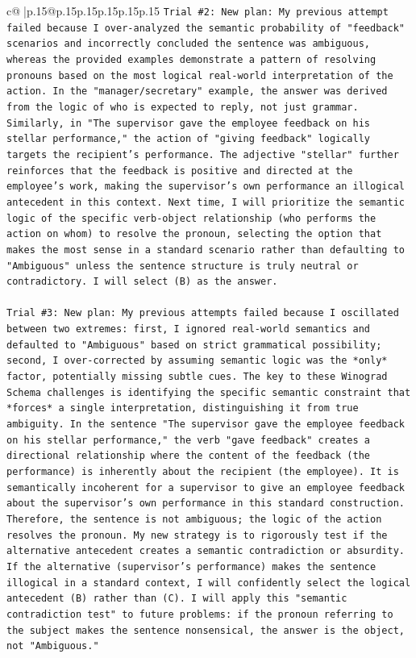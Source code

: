 \documentclass{article}
\begin{document}
{\begin{supertabular}{c@{$\;$}|p{.15\linewidth}@{}p{.15\linewidth}p{.15\linewidth}p{.15\linewidth}p{.15\linewidth}p{.15\linewidth}}
{{{\texttt{Trial \#2: New plan: My previous attempt failed because I over{-}analyzed the semantic probability of "feedback" scenarios and incorrectly concluded the sentence was ambiguous, whereas the provided examples demonstrate a pattern of resolving pronouns based on the most logical real{-}world interpretation of the action. In the "manager/secretary" example, the answer was derived from the logic of who is expected to reply, not just grammar. Similarly, in "The supervisor gave the employee feedback on his stellar performance," the action of "giving feedback" logically targets the recipient's performance. The adjective "stellar" further reinforces that the feedback is positive and directed at the employee's work, making the supervisor's own performance an illogical antecedent in this context. Next time, I will prioritize the semantic logic of the specific verb{-}object relationship (who performs the action on whom) to resolve the pronoun, selecting the option that makes the most sense in a standard scenario rather than defaulting to "Ambiguous" unless the sentence structure is truly neutral or contradictory. I will select (B) as the answer.} \\
\\ 
\texttt{Trial \#3: New plan: My previous attempts failed because I oscillated between two extremes: first, I ignored real{-}world semantics and defaulted to "Ambiguous" based on strict grammatical possibility; second, I over{-}corrected by assuming semantic logic was the *only* factor, potentially missing subtle cues. The key to these Winograd Schema challenges is identifying the specific semantic constraint that *forces* a single interpretation, distinguishing it from true ambiguity. In the sentence "The supervisor gave the employee feedback on his stellar performance," the verb "gave feedback" creates a directional relationship where the content of the feedback (the performance) is inherently about the recipient (the employee). It is semantically incoherent for a supervisor to give an employee feedback about the supervisor's own performance in this standard construction. Therefore, the sentence is not ambiguous; the logic of the action resolves the pronoun. My new strategy is to rigorously test if the alternative antecedent creates a semantic contradiction or absurdity. If the alternative (supervisor's performance) makes the sentence illogical in a standard context, I will confidently select the logical antecedent (B) rather than (C). I will apply this "semantic contradiction test" to future problems: if the pronoun referring to the subject makes the sentence nonsensical, the answer is the object, not "Ambiguous."} \\
}}}
\end{supertabular}}
\end{document}
